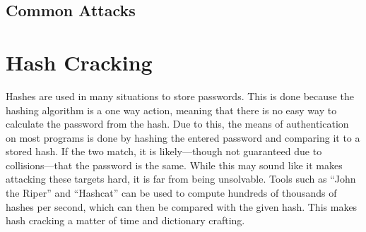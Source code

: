 		\subsection{Common Attacks}
	\section{Hash Cracking}
		Hashes are used in many situations to store passwords. 
		This is done because the hashing algorithm is a one way action, meaning that there is no easy way to calculate the password from the hash. 
		Due to this, the means of authentication on most programs is done by hashing the entered password and comparing it to a stored hash. 
		If the two match, it is likely---though not guaranteed due to collisions---that the password is the same. 
		While this may sound like it makes attacking these targets hard, it is far from being unsolvable. 
		Tools such as ``John the Riper'' and ``Hashcat'' can be used to compute hundreds of thousands of hashes per second, which can then be compared with the given hash. 
		This makes hash cracking a matter of time and dictionary crafting. 
